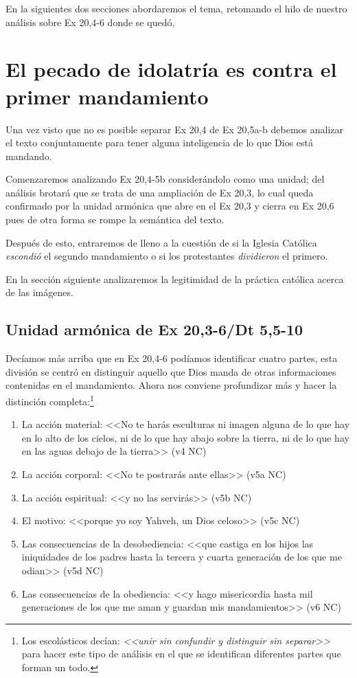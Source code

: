 \documentclass{article}
\begin{document}
En la siguientes dos secciones abordaremos el tema, retomando el hilo de nuestro an\'alisis sobre Ex 20,4-6 donde se qued\'o.

\section{El pecado de idolatr\'{i}a es contra el primer mandamiento}

Una vez visto que no es posible separar Ex 20,4 de Ex 20,5a-b debemos analizar el texto conjuntamente para tener alguna inteligencia de lo que Dios est\'a mandando.

Comenzaremos analizando Ex 20,4-5b consider\'andolo como una unidad; del an\'alisis brotar\'a que se trata de una ampliaci\'on de Ex 20,3, lo cual queda confirmado por la unidad arm\'onica que abre en el Ex 20,3 y cierra en Ex 20,6 pues de otra forma se rompe la sem\'antica del texto.

Despu\'es de esto, entraremos de lleno a la cuesti\'on de si la Iglesia Cat\'olica \emph{escondi\'o} el segundo mandamiento o si los protestantes \emph{dividieron} el primero.

En la secci\'on siguiente analizaremos la legitimidad de la pr\'actica cat\'olica acerca de las im\'agenes.

\subsection{Unidad arm\'onica de Ex 20,3-6/Dt 5,5-10}

Dec\'{i}amos m\'as arriba que en Ex 20,4-6 pod\'{i}amos identificar cuatro partes, esta divisi\'on se centr\'o en distinguir aquello que Dios manda de otras informaciones contenidas en el mandamiento. Ahora nos conviene profundizar m\'as y hacer la distinci\'on completa:\footnote{Los escol\'asticos dec\'{i}an: \emph{<<unir sin confundir y distinguir sin separar>>} para hacer este tipo de an\'alisis en el que se identifican diferentes partes que forman un todo.}

\begin{enumerate}
\item La acci\'on material: <<No te har\'as esculturas ni imagen alguna de lo que hay en lo alto de los cielos, ni de lo que hay abajo sobre la tierra, ni de lo que hay en las aguas debajo de la tierra>> (v4 NC)
\item La acci\'on corporal: <<No te postrar\'as ante ellas>> (v5a NC)
\item La acci\'on espiritual: <<y no las servir\'as>> (v5b NC)
\item El motivo: <<porque yo soy Yahveh, un Dios celoso>> (v5c NC)
\item Las consecuencias de la desobediencia: <<que castiga en los hijos las iniquidades de los padres hasta la tercera y cuarta generaci\'on de los que me odian>> (v5d NC)
\item Las consecuencias de la obediencia: <<y hago misericordia hasta mil generaciones de los que me aman y guardan mis mandamientos>> (v6 NC)
\end{enumerate}
\end{document}
